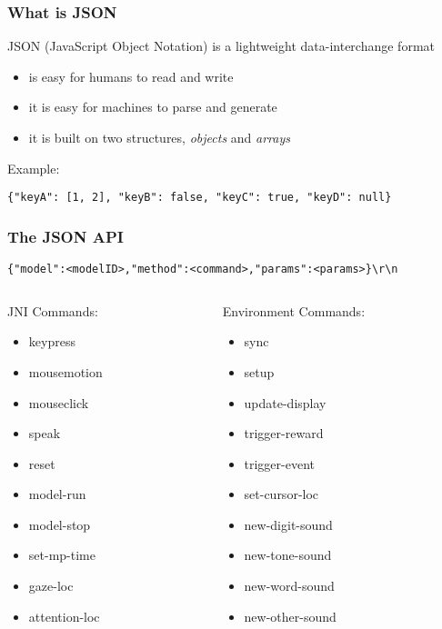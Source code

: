 \documentclass{beamer}
\begin{document}
\begin{frame}[fragile]
\frametitle{What is JSON}
JSON (JavaScript Object Notation) is a lightweight data-interchange format
\begin{itemize}
\item is easy for humans to read and write
\item it is easy for machines to parse and generate
\item it is built on two structures, \textit{objects} and \textit{arrays}
\end{itemize}
\vfill
Example:
\begin{center}\scriptsize
\begin{verbatim}
{"keyA": [1, 2], "keyB": false, "keyC": true, "keyD": null}
\end{verbatim}
\end{center}
\end{frame}

\begin{frame}[fragile]
\frametitle{The JSON API}
\small{
\begin{verbatim}
{"model":<modelID>,"method":<command>,"params":<params>}\r\n
\end{verbatim}
}
\vfill
\begin{columns}
	\scriptsize
	\begin{column}{.5\linewidth}
		JNI Commands:
		\begin{itemize}
		\item keypress
		\item mousemotion
		\item mouseclick
		\item speak
		\item reset
		\item model-run
		\item model-stop
		\item set-mp-time
		\item gaze-loc
		\item attention-loc
		\end{itemize}
	\end{column}
	\begin{column}{.5\linewidth}
		Environment Commands:
		\begin{itemize}
		\item sync
		\item setup
		\item update-display
		\item trigger-reward
		\item trigger-event
		\item set-cursor-loc
		\item new-digit-sound
		\item new-tone-sound
		\item new-word-sound
		\item new-other-sound
		\end{itemize}
	\end{column}
\end{columns}
\end{frame}
\end{document}
